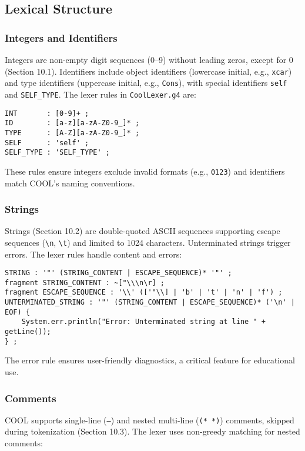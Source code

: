 \documentclass[11pt, titlepage]{article}
\begin{document}
\subsection{Lexical Structure}

\subsubsection{Integers and Identifiers}
Integers are non-empty digit sequences (0--9) without leading zeros, except for 0 (Section 10.1). Identifiers include object identifiers (lowercase initial, e.g., \texttt{xcar}) and type identifiers (uppercase initial, e.g., \texttt{Cons}), with special identifiers \texttt{self} and \texttt{SELF\_TYPE}. The lexer rules in \texttt{CoolLexer.g4} are:

\begin{lstlisting}
INT       : [0-9]+ ;
ID        : [a-z][a-zA-Z0-9_]* ;
TYPE      : [A-Z][a-zA-Z0-9_]* ;
SELF      : 'self' ;
SELF_TYPE : 'SELF_TYPE' ;
\end{lstlisting}

These rules ensure integers exclude invalid formats (e.g., \texttt{0123}) and identifiers match COOL's naming conventions.

\subsubsection{Strings}
Strings (Section 10.2) are double-quoted ASCII sequences supporting escape sequences (\texttt{\textbackslash n}, \texttt{\textbackslash t}) and limited to 1024 characters. Unterminated strings trigger errors. The lexer rules handle content and errors:

\begin{lstlisting}
STRING : '"' (STRING_CONTENT | ESCAPE_SEQUENCE)* '"' ;
fragment STRING_CONTENT : ~["\\\n\r] ;
fragment ESCAPE_SEQUENCE : '\\' (['"\\] | 'b' | 't' | 'n' | 'f') ;
UNTERMINATED_STRING : '"' (STRING_CONTENT | ESCAPE_SEQUENCE)* ('\n' | EOF) {
    System.err.println("Error: Unterminated string at line " + getLine());
} ;
\end{lstlisting}

The error rule ensures user-friendly diagnostics, a critical feature for educational use.

\subsubsection{Comments}
COOL supports single-line (\texttt{--}) and nested multi-line (\texttt{(* *)}) comments, skipped during tokenization (Section 10.3). The lexer uses non-greedy matching for nested comments:
\end{document}

